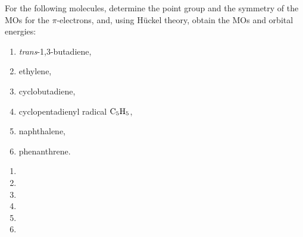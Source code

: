 \documentclass[a4paper]{book}
\begin{document}
	\setcounter{chapter}{10}

	\begin{exercise}
		For the following molecules, determine the point group and the symmetry of the MOs for the $\pi$-electrons, and, using H{\"u}ckel theory, obtain the MOs and orbital energies:
		\begin{enumerate}[label=(\alph*)]
		\item {\it trans}-1,3-butadiene,
		\item ethylene,
		\item cyclobutadiene,
		\item cyclopentadienyl radical $\ce{C5H5}$,
		\item naphthalene,
		\item phenanthrene.
		\end{enumerate}
	\end{exercise}

	\begin{solution}

		\begin{enumerate}[label=(\alph*)]
	
		\item 
		
		\item 
		
		\item 
				
		\item 
				
		\item 
		
		\item 
		
		\end{enumerate}	
		
	\end{solution}
\end{document}
